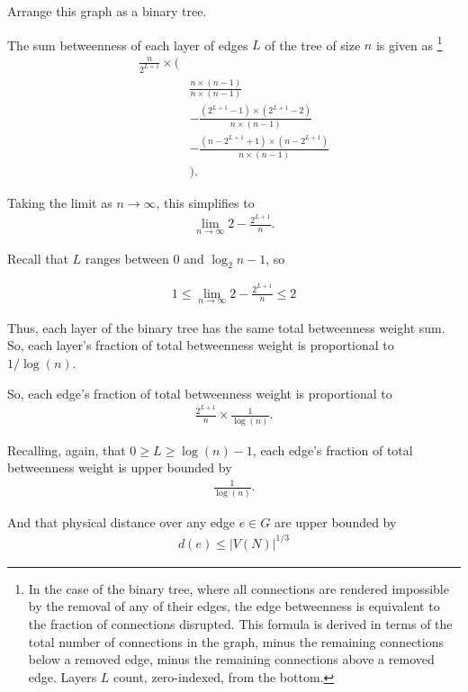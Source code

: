 Arrange this graph as a binary tree.

The sum betweenness of each layer of edges $L$ of the tree of size $n$ is given as
\footnote{
In the case of the binary tree, where all connections are rendered impossible by the removal of any of their edges, the edge betweenness is equivalent to the fraction of connections disrupted.
This formula is derived in terms of the total number of connections in the graph, minus the remaining connections below a removed edge, minus the remaining connections above a removed edge.
Layers $L$ count, zero-indexed, from the bottom.
}
\begin{align*}
\frac{n}{2^{L+1}}
\times
\Big(&\\
  &\frac{
    n \times (n-1)
  }{
    n \times (n -1)
  }\\
  &-
  \frac{
    (2^{L+1} - 1) \times (2^{L+1} - 2)
  }{
    n \times (n -1)
  }\\
  &-
  \frac{
    (n - 2^{L+1} + 1) \times (n - 2^{L+1})
  }{
    n \times (n -1)
  }\\
&\Big).
\end{align*}

Taking the limit as $n \rightarrow \infty$, this simplifies to
\begin{align*}
\lim_{n \rightarrow \infty}
2
-
\frac{
  2^{L+1}
}{
  n
}
.
\end{align*}

Recall that $L$ ranges between 0 and $\log_2 n - 1$, so

\begin{align*}
1
\leq
\lim_{n \rightarrow \infty}
2
-
\frac{
  2^{L+1}
}{
  n
}
\leq
2
\end{align*}

Thus, each layer of the binary tree has the same total betweenness weight sum.
So, each layer's fraction of total betweenness weight is proportional to $1/\log(n)$.

So, each edge's fraction of total betweenness weight is proportional to
\begin{align*}
\frac{2^{L+1}}{n} \times \frac{1}{\log(n)}.
\end{align*}

Recalling, again, that $0 \geq L \geq \log(n) - 1$, each edge's fraction of total betweenness weight is upper bounded by
\begin{align*}
\frac{1}{\log(n)}.
\end{align*}

And that physical distance over any edge $e \in G$ are upper bounded by
\begin{align*}
d(e) \leq |V(N)|^{1/3}
\end{align*}


